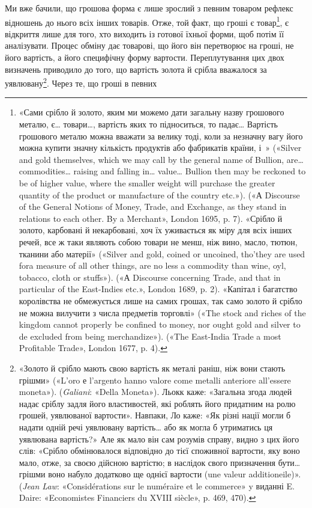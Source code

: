 Ми вже бачили, що грошова форма є лише зрослий з певним
товаром рефлекс відношень до нього всіх інших товарів. Отже,
той факт, що гроші є товар\footnote{
«Сами срібло й золото, яким ми можемо дати загальну назву грошового
металю, є\dots{} товари\dots{}, вартість яких то підноситься, то падає\dots{}
Вартість грошового металю можна вважати за велику тоді, коли за
незначну вагу його можна купити значну кількість продуктів або фабрикатів
 країни, і~» («Silver and gold themselves, which we may call
by the general name of Bullion, are\dots{} commodities\dots{} raising and falling
in\dots{} value\dots{} Bullion then may be reckoned to be of higher value, where
the smaller weight will purchase the greater quantity of the product or
manufacture of the country etc.»). («А Discourse of the General Notions
of Money, Trade, and Exchange, as they stand in relations to each other.
By a Merchant», London 1695, p. 7). «Срібло й золото, карбовані й некарбовані,
хоч їх уживається як міру для всіх інших речей, все ж таки
являють собою товари не менш, ніж вино, масло, тютюн, тканини або матерії»
(«Silver and gold, coined or uncoined, tho’they are used fora measure
of all other things, are no less a commodity than wine, oyl, tobacco,
cloth or stuffs»). («А Discourse concerning Trade, and that in particular
of the East-Indies etc.», London 1689, p. 2). «Капітал і багатство королівства
не обмежується лише на самих грошах, так само золото й срібло
не можна вилучити з числа предметів торговлі» («The stock and riches
of the kingdom cannot properly be confined to money, nor ought gold and
silver to de excluded from being merchandize»). («The East-India Trade
a most Profitable Trade», London 1677, p. 4).
}, є відкриття лише для того, хто
виходить із готової їхньої форми, щоб потім її аналізувати. Процес
обміну дає товарові, що його він перетворює на гроші, не його
вартість, а його специфічну форму вартости. Переплутування
цих двох визначень приводило до того, що вартість золота й
срібла вважалося за уявлювану\footnote{
«Золото й срібло мають свою вартість як металі раніш, ніж вони
стають грішми» («L’oro е l’argento hanno valore come metalli anteriore
all’essere moneta»). (\emph{Galiani}: «Della Moneta»). Льокк каже: «Загальна
згода людей надає сріблу задля його властивостей, які роблять
його придатним на ролю грошей, уявлюваної вартости». Навпаки, Ло
каже: «Як різні нації могли б надати одній речі уявлювану вартість\dots{}
або як могла б утриматись ця уявлювана вартість?» Але як мало він сам
розумів справу, видно з цих його слів: «Срібло обмінювалося відповідно
до тієї споживної вартости, яку воно мало, отже, за своєю дійсною вартістю;
в наслідок свого призначення бути\dots{} грішми воно набуло додатково
ще однієї вартости (une valeur additioneile)». (\emph{Jean Law}: «Considérations
sur le numéraire et le commerce» y виданні E. Daire: «Economistes
Financiers du XVIII siècle», p. 469, 470).
}. Через те, що гроші в певних
